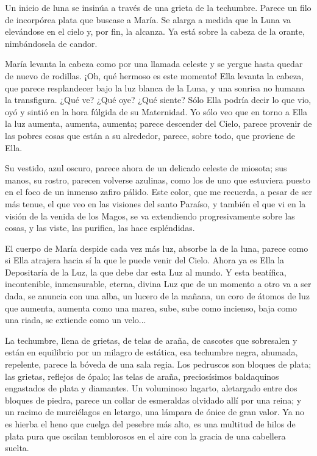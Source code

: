 \documentclass[12pt]{book} %
\begin{document}
Un inicio de luna se insinúa a través de una grieta de la techumbre. Parece un filo de incorpórea plata que buscase a María. Se alarga a medida que la Luna va elevándose en el cielo y, por fin, la alcanza. Ya está sobre la cabeza de la orante, nimbándosela de candor. 

María levanta la cabeza como por una llamada celeste y se yergue hasta quedar de nuevo de rodillas. ¡Oh, qué hermoso es este momento! Ella levanta la cabeza, que parece resplandecer bajo la luz blanca de la Luna, y una sonrisa no humana la transfigura. ¿Qué ve? ¿Qué oye? ¿Qué siente? Sólo Ella podría decir lo que vio, oyó y sintió en la hora fúlgida de su Maternidad. Yo sólo veo que en torno a Ella la luz aumenta, aumenta, aumenta; parece descender del Cielo, parece provenir de las pobres cosas que están a su alrededor, parece, sobre todo, que proviene de Ella. 

Su vestido, azul oscuro, parece ahora de un delicado celeste de miosota; sus manos, su rostro, parecen volverse azulinas, como los de uno que estuviera puesto en el foco de un inmenso zafiro pálido. Este color, que me recuerda, a pesar de ser más tenue, el que veo en las visiones del santo Paraíso, y también el que vi en la visión de la venida de los Magos, se va extendiendo progresivamente sobre las cosas, y las viste, las purifica, las hace espléndidas. 

El cuerpo de María despide cada vez más luz, absorbe la de la luna, parece como si Ella atrajera hacia sí la que le puede venir del Cielo. Ahora ya es Ella la Depositaría de la Luz, la que debe dar esta Luz al mundo. Y esta beatífica, incontenible, inmensurable, eterna, divina Luz que de un momento a otro va a ser dada, se anuncia con una alba, un lucero de la mañana, un coro de átomos de luz que aumenta, aumenta como una marea, sube, sube como incienso, baja como una riada, se extiende como un velo... 

La techumbre, llena de grietas, de telas de araña, de cascotes que sobresalen y están en equilibrio por un milagro de estática, esa techumbre negra, ahumada, repelente, parece la bóveda de una sala regia. Los pedruscos son bloques de plata; las grietas, reflejos de ópalo; las telas de araña, preciosísimos baldaquinos engastados de plata y diamantes. Un voluminoso lagarto, aletargado entre dos bloques de piedra, parece un collar de esmeraldas olvidado allí por una reina; y un racimo de murciélagos en letargo, una lámpara de ónice de gran valor. Ya no es hierba el heno que cuelga del pesebre más alto, es una multitud de hilos de plata pura que oscilan temblorosos en el aire con la gracia de una cabellera suelta. 
\end{document}
